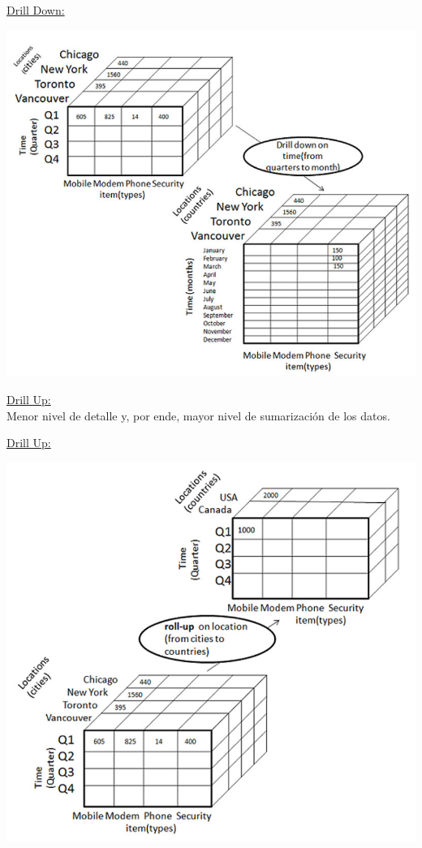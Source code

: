 \documentclass{fancyslides}
\begin{document}
\begin{frame}
\misc
{
  \underline{Drill Down:}
  \begin{center}
  \includegraphics[scale=0.5]{drill_down}
  \end{center}
}
\end{frame}


\begin{frame}
\misc
{
  \underline{Drill Up:}\\
  Menor nivel de detalle y, por ende, mayor nivel de sumarización de los datos.
}
\end{frame}

\begin{frame}
\misc
{
  \underline{Drill Up:}
  \begin{center}
  \includegraphics[scale=0.2]{drill_up}
  \end{center}
}
\end{frame}
\end{document}
